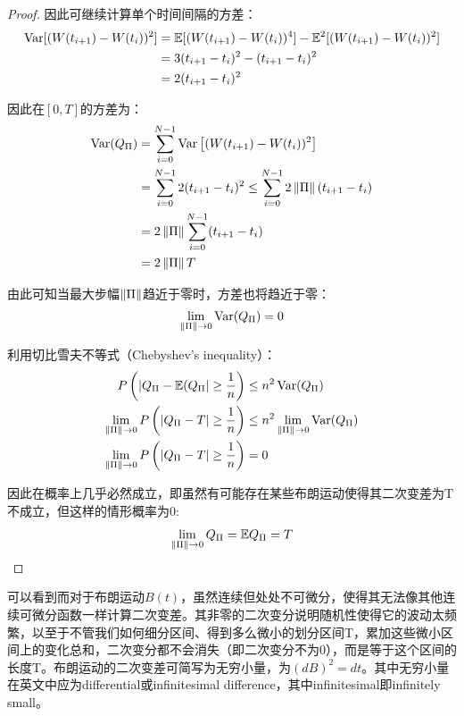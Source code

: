 \documentclass[11pt]{article}
\begin{document}
\begin{proof}
    因此可继续计算单个时间间隔的方差：
    \begin{align*}
        \operatorname{Var} [(W(t_{i+1}) - W(t_{i}))^2] &= \mathbb{E} [(W(t_{i+1}) - W(t_{i}))^4] - \mathbb{E}^2 [(W(t_{i+1}) - W(t_{i}))^2] \\
        &= 3(t_{i+1}-t_{i})^2 - (t_{i+1}-t_{i})^2 \\
        &= 2(t_{i+1}-t_{i})^2
    \end{align*}

    因此在$[0,T]$的方差为：
    \begin{align*}
        \operatorname{Var}(Q_{\Pi}) &= \sum_{i=0}^{N-1} \operatorname{Var} \left[(W(t_{i+1}) - W(t_{i}))^2 \right] \\
        &=  \sum_{i=0}^{N-1} 2(t_{i+1}-t_{i})^2
        \leq \sum_{i=0}^{N-1} 2\left\lVert \Pi\right\rVert (t_{i+1}-t_{i}) \\
        &= 2\left\lVert \Pi\right\rVert \sum_{i=0}^{N-1} (t_{i+1}-t_{i}) \\
        &= 2\left\lVert \Pi\right\rVert T
    \end{align*}

    由此可知当最大步幅$\left\lVert \Pi\right\rVert$趋近于零时，方差也将趋近于零：
    \begin{align*}
        \lim\limits_{\left\lVert \Pi\right\rVert \rightarrow 0} \operatorname{Var}(Q_{\Pi}) = 0
    \end{align*}

    利用切比雪夫不等式（Chebyshev's inequality）：
    \begin{align*}
        P\left( \left\lvert Q_{\Pi} - \mathbb{E}(Q_{\Pi}\right\rvert \geq \frac{1}{n} \right) &\leq n^2 \operatorname{Var}(Q_{\Pi}) \\
        \lim_{\left\lVert \Pi\right\rVert \rightarrow 0} P\left( \left\lvert Q_{\Pi} - T\right\rvert \geq \frac{1}{n} \right) &\leq n^2 \lim_{\left\lVert \Pi\right\rVert \rightarrow 0} \operatorname{Var}(Q_{\Pi})  \\
        \lim_{\left\lVert \Pi\right\rVert \rightarrow 0} P\left( \left\lvert Q_{\Pi} - T\right\rvert \geq \frac{1}{n} \right) &= 0
    \end{align*}
    
    因此在概率上几乎必然成立，即虽然有可能存在某些布朗运动使得其二次变差为T不成立，但这样的情形概率为0:
    \begin{equation*}
        \lim_{\left\lVert \Pi\right\rVert \rightarrow 0} Q_{\Pi} = \mathbb{E} Q_\Pi = T
    \end{equation*}
\end{proof}

可以看到而对于布朗运动$B(t)$，虽然连续但处处不可微分，使得其无法像其他连续可微分函数一样计算二次变差。其非零的二次变分说明随机性使得它的波动太频繁，以至于不管我们如何细分区间、得到多么微小的划分区间T，累加这些微小区间上的变化总和，二次变分都不会消失（即二次变分不为0），而是等于这个区间的长度T。布朗运动的二次变差可简写为无穷小量，为$(dB)^2=dt$。其中无穷小量在英文中应为differential或infinitesimal difference，其中infinitesimal即infinitely small。
\end{document}
